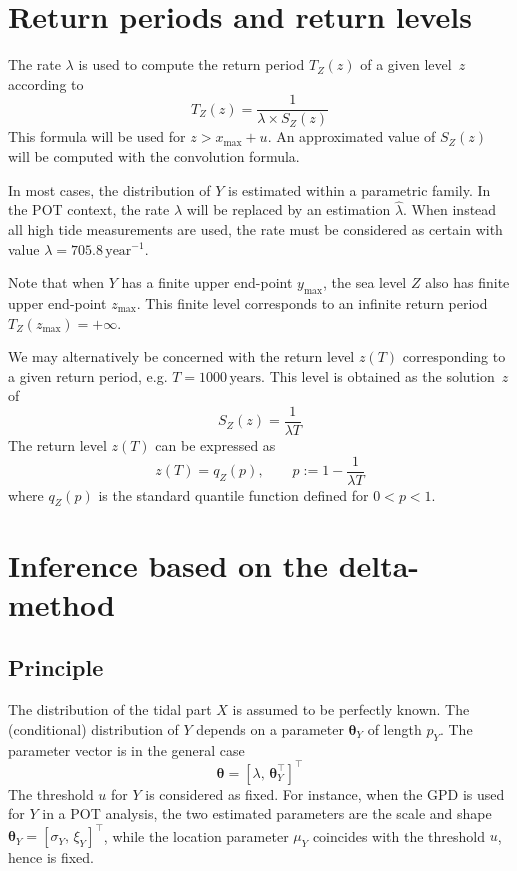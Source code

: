 \documentclass[11pt,a4paper]{report}\usepackage[]{graphicx}\usepackage[]{color}
\newcommand{\bs}{\boldsymbol}
\newcommand{\Up}[1]{#1_{\mathrm{max}}}
\begin{document}
\section{Return periods and return levels}
The rate $\lambda$ is used to compute the return period $T_Z(z)$ of a
given level~$z$ according to
$$
   T_Z(z) = \frac{1}{\lambda \times S_Z(z)}
$$
This formula will be used for $z > \Up{x} + u$. An approximated
value of $S_Z(z)$ will be computed with the convolution formula.

In most cases, the distribution of $Y$ is estimated within a
parametric family. In the POT context, the rate $\lambda$ will be
replaced by an estimation $\widehat{\lambda}$. When instead all high
tide measurements are used, the rate must be considered as certain
with value $\lambda = 705.8\,\mathrm{year}^{-1}$.

Note that when $Y$ has a finite upper end-point $\Up{y}$, the sea
level $Z$ also has finite upper end-point $\Up{z}$. This finite level
corresponds to an infinite return period $ T_Z(\Up{z}) = +\infty$.

We may alternatively be concerned with the return level
$z(T)$ corresponding to a given return period, e.g. $T=1000\,\mathrm{years}$.
This level is obtained as the solution~$z$ of
\begin{equation}
   \label{eq:RETLEV}
   S_Z(z) = \frac{1}{\lambda T}
\end{equation}
The return level $z(T)$ can be expressed as
\begin{equation}
   \label{eq:RETLEV2}
   z(T) = q_Z(p), \qquad p := 1-\frac{1}{\lambda T}
\end{equation}
where $q_Z(p)$ is the standard quantile function defined for $0<p<1$.


\section{Inference based on the delta-method}
\subsection{Principle}
The distribution of the tidal part $X$ is assumed to be perfectly known.
The (conditional) distribution of $Y$ depends on a parameter $\bs{\theta}_Y$
of length $p_Y$. The parameter vector is in the general case
$$
   \bs{\theta} = [\lambda,\,\bs{\theta}_Y^\top ]^\top
$$
The threshold $u$ for $Y$ is considered as fixed.  For instance, when
the GPD is used for $Y$ in a POT analysis, the two estimated
parameters are the scale and shape $\bs{\theta}_Y = \left[
  \sigma_Y,\,\xi_Y \right]^\top$, while the location parameter $\mu_Y$
coincides with the threshold $u$, hence is fixed.
\end{document}

